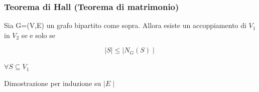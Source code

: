 \documentclass{article}
\begin{document}
        \subsubsection{Teorema di Hall (Teorema di matrimonio)}
        \begin{flushleft}
          Sia G=(V,E) un grafo bipartito come sopra. Allora esiste un accoppiamento di $V_1$ in $V_2$ se e solo se
        \end{flushleft}
        \begin{equation*}
          \mid S \mid \leq \mid N_G(S) \mid
        \end{equation*}
        \begin{flushleft}
          $\forall S \subseteq V_1$
        \end{flushleft}
        \begin{flushleft}
          Dimostrazione per induzione su $\mid E \mid$
        \end{flushleft}
\end{document}
